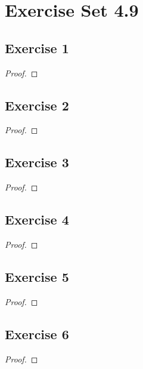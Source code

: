 \documentclass[14pt]{extarticle}
\begin{document}
\section{Exercise Set 4.9}

\subsection{Exercise 1}

\begin{proof}

\end{proof}

\subsection{Exercise 2}

\begin{proof}

\end{proof}

\subsection{Exercise 3}

\begin{proof}

\end{proof}

\subsection{Exercise 4}

\begin{proof}

\end{proof}

\subsection{Exercise 5}

\begin{proof}

\end{proof}

\subsection{Exercise 6}

\begin{proof}

\end{proof}
\end{document}
